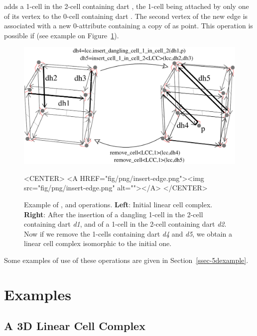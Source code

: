  adds a 1-cell in
the 2-cell containing dart , the 1-cell being attached by only
one of its vertex to the 0-cell containing dart .  The second
vertex of the new edge is associated with a new 0-attribute containing
a copy of  as point. This operation is possible if
\myin{} (see example on
Figure~\ref{fig-lcc-insert-dangling-edge}).
  \begin{figure}[htb]
    \begin{ccTexOnly}
      \begin{center}
        \includegraphics[width=.72\textwidth]{Linear_cell_complex/fig/pdf/insert-edge}
      \end{center}
    \end{ccTexOnly}
    \begin{ccHtmlOnly}
      <CENTER> <A HREF="fig/png/insert-edge.png"><img
      src="fig/png/insert-edge.png" alt=""></A> </CENTER>
    \end{ccHtmlOnly}
    \caption{Example of ,
       and
       operations. \textbf{Left}: Initial linear
      cell complex.  \textbf{Right}: After the insertion of a dangling
      1-cell in the 2-cell containing dart \emph{d1}, and of a 1-cell
      in the 2-cell containing dart \emph{d2}. Now if we remove
      the 1-cells containing dart \emph{d4} and \emph{d5},
      we obtain a linear cell complex isomorphic to the initial one.}
    \label{fig-lcc-insert-dangling-edge}
  \end{figure}

  Some examples of use of these operations are given in
  Section~\ref{ssec-5dexample}.

\section{Examples}

\subsection{A 3D Linear Cell Complex}\label{ssec-3D-lcc}

